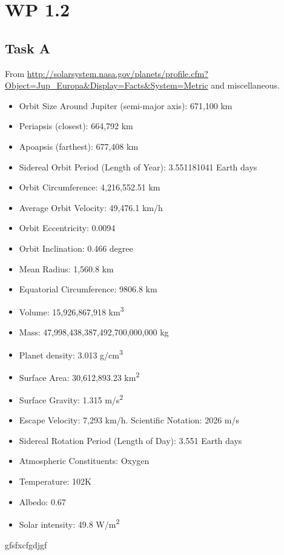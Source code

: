 \documentclass{article}
\begin{document}
\section*{WP 1.2}
\subsection*{Task A}
From \url{http://solarsystem.nasa.gov/planets/profile.cfm?Object=Jup_Europa&Display=Facts&System=Metric} and miscellaneous.
\begin{itemize}
\item{Orbit Size Around Jupiter (semi-major axis):}  671,100 km
\item{Periapsis (closest):}  664,792 km
\item{Apoapsis (farthest):}  677,408 km
\item{Sidereal Orbit Period (Length of Year):} 3.551181041 Earth days
\item{Orbit Circumference:}  4,216,552.51 km
\item{Average Orbit Velocity:}  49,476.1 km/h
\item{Orbit Eccentricity:} 0.0094
\item{Orbit Inclination:} 0.466 degree
\item{Mean Radius:}  1,560.8 km
\item{Equatorial Circumference:}  9806.8 km
\item{Volume:}  15,926,867,918 \si{km^3}
\item{Mass:}  47,998,438,387,492,700,000,000 kg
\item{Planet density:}  3.013 \si{g/cm^3}
\item{Surface Area:}  30,612,893.23 \si{km^2}
\item{Surface Gravity:}  1.315 \si{m/s^2}
\item{Escape Velocity:}  7,293 km/h. Scientific Notation: 2026 m/s
\item{Sidereal Rotation Period (Length of Day):} 3.551 Earth days
\item{Atmospheric Constituents:} Oxygen
\item{Temperature:} 102K
\item{Albedo:} 0.67
\item{Solar intensity:} 49.8 \si{W/m^2}
\end{itemize}gfsfxcfgdjgf
\end{document}
